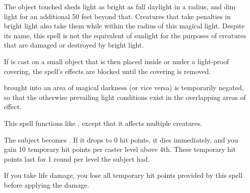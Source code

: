 \spellrng{\rngtouch}
\begin{spelleffect}
  The object touched sheds light as bright as full daylight in a \arealarge radius, and dim light for an additional 50 feet beyond that. Creatures that take penalties in bright light also take them while within the radius of this magical light. Despite its name, this spell is not the equivalent of sunlight for the purposes of creatures that are damaged or destroyed by bright light.
  \par If  is cast on a small object that is then placed inside or under a light-proof covering, the spell's effects are blocked until the covering is removed.
\end{spelleffect}
\begin{spellnotes}
   brought into an area of magical darkness (or vice versa) is temporarily negated, so that the otherwise prevailing light conditions exist in the overlapping areas of effect.
\end{spellnotes}

\spellrng{\rngmed}
\begin{spelleffect}
  This spell functions like , except that it affects multiple creatures.
\end{spelleffect}

\spellrng{\rngmed}
\begin{spellblood}
  The subject becomes \vulnerable. If it drops to 0 hit points, it dies immediately, and you gain 10 temporary hit points  per caster level above 4th. These temporary hit points last for 1 round per level the subject had.

 If you take life damage, you lose all temporary hit points provided by this spell before applying the damage.
\end{spellblood}

